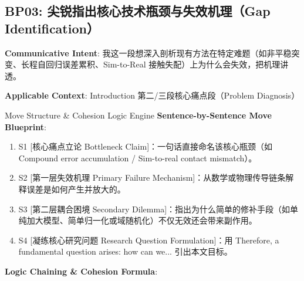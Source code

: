 \subsection{BP03: 尖锐指出核心技术瓶颈与失效机理（Gap Identification）}\label{sec:bp:BP03}
\noindent\textbf{\color{AcadNavy}Communicative Intent}: 我这一段想深入剖析现有方法在特定难题（如非平稳突变、长程自回归误差累积、Sim-to-Real 接触失配）上为什么会失效，把机理讲透。\par\vspace{2pt}
\noindent\textbf{\color{AcadSlate}Applicable Context}: Introduction 第二/三段核心痛点段（Problem Diagnosis）\par\vspace{4pt}
\begin{ConceptBox}{Move Structure \& Cohesion Logic Engine}
\textbf{Sentence-by-Sentence Move Blueprint}:
\begin{enumerate}[label=\textbf{\color{AcadNavy}S\arabic*.}, leftmargin=2em, itemsep=2pt]
  \item S1 [核心痛点立论 Bottleneck Claim]：一句话直接命名该核心瓶颈（如 Compound error accumulation / Sim-to-real contact mismatch）。
  \item S2 [第一层失效机理 Primary Failure Mechanism]：从数学或物理传导链条解释误差是如何产生并放大的。
  \item S3 [第二层耦合困境 Secondary Dilemma]：指出为什么简单的修补手段（如单纯加大模型、简单归一化或域随机化）不仅无效还会带来副作用。
  \item S4 [凝练核心研究问题 Research Question Formulation]：用 Therefore, a fundamental question arises: how can we... 引出本文目标。
\end{enumerate}\par\vspace{4pt}
\textbf{Logic Chaining \& Cohesion Formula}:\par{}
\end{ConceptBox}
